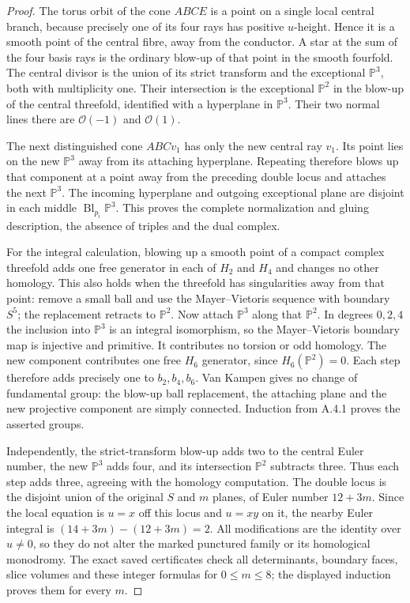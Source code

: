 \begin{proof}
The torus orbit of the cone $ABCE$ is a point on a single
local central branch, because precisely one of its four
rays has positive $u$-height. Hence it is a smooth point
of the central fibre, away from the conductor. A star at
the sum of the four basis rays is the ordinary blow-up
of that point in the smooth fourfold. The central divisor
is the union of its strict transform and the exceptional
$\mathbb P^3$, both with multiplicity one. Their
intersection is the exceptional $\mathbb P^2$ in the
blow-up of the central threefold, identified with a
hyperplane in $\mathbb P^3$. Their two normal lines there
are $\mathcal O(-1)$ and $\mathcal O(1)$.

The next distinguished cone $ABCv_1$ has only the new
central ray $v_1$. Its point lies on the new $\mathbb P^3$
away from its attaching hyperplane. Repeating therefore
blows up that component at a point away from the preceding
double locus and attaches the next $\mathbb P^3$. The
incoming hyperplane and outgoing exceptional plane are
disjoint in each middle $\operatorname{Bl}_{p_i}\mathbb P^3$.
This proves the complete normalization and gluing
description, the absence of triples and the dual complex.

For the integral calculation, blowing up a smooth point
of a compact complex threefold adds one free generator
in each of $H_2$ and $H_4$ and changes no other homology.
This also holds when the threefold has singularities away
from that point: remove a small ball and use the
Mayer--Vietoris sequence with boundary $S^5$; the
replacement retracts to $\mathbb P^2$. Now attach
$\mathbb P^3$ along that $\mathbb P^2$. In degrees
$0,2,4$ the inclusion into $\mathbb P^3$ is an integral
isomorphism, so the Mayer--Vietoris boundary map is
injective and primitive. It contributes no torsion or
odd homology. The new component contributes one free
$H_6$ generator, since $H_6(\mathbb P^2)=0$. Each step
therefore adds precisely one to $b_2,b_4,b_6$.
Van Kampen gives no change of fundamental group: the
blow-up ball replacement, the attaching plane and the
new projective component are simply connected.
Induction from A.4.1 proves the asserted groups.

Independently, the strict-transform blow-up adds two to
the central Euler number, the new $\mathbb P^3$ adds
four, and its intersection $\mathbb P^2$ subtracts
three. Thus each step adds three, agreeing with the
homology computation. The double locus is the disjoint
union of the original $S$ and $m$ planes, of Euler number
$12+3m$. Since the local equation is $u=x$ off this locus
and $u=xy$ on it, the nearby Euler integral is
$(14+3m)-(12+3m)=2$. All modifications are the identity
over $u\ne0$, so they do not alter the marked punctured
family or its homological monodromy. The exact saved
certificates check all determinants, boundary faces,
slice volumes and these integer formulas for $0\leq m\leq8$;
the displayed induction proves them for every $m$.
\end{proof}

